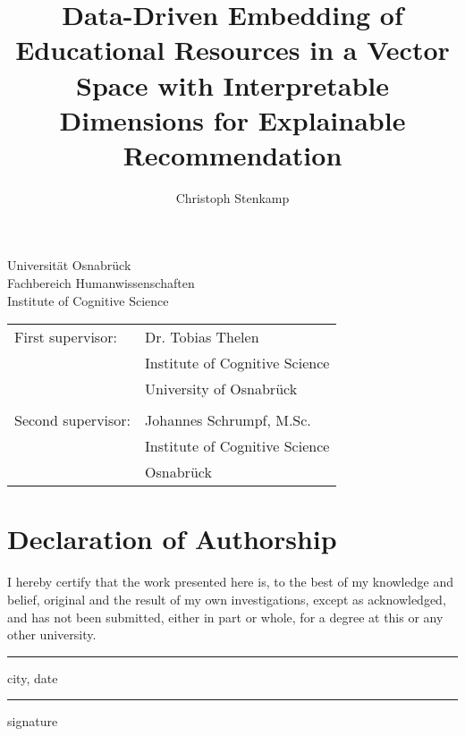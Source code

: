 \documentclass[11pt,
  paper=a4, 
  hidelinks,
  bibliography=totocnumbered,
	captions=tableheading,
	BCOR=10mm
]{scrreprt}
\title{Data-Driven Embedding of Educational Resources in a Vector Space with Interpretable Dimensions for Explainable Recommendation}
\author{Christoph Stenkamp}
\theoremstyle{definition}
\newcommand{\namesigdate}[1][5cm]{%
	\vspace{5cm}
	{\setlength{\parindent}{0cm}
	\begin{minipage}{0.3\textwidth}
		\hrule 
		\vspace{0.5cm}
		{\small city, date}
	\end{minipage}
	 \hfill
	\begin{minipage}{0.3\textwidth}
		\hrule
		\vspace{0.5cm}
	    {\small signature}
	\end{minipage}
	}
}
\begin{document}
\cleardoublepage
\pagestyle{plain} %


\begin{titlepage}
	\begin{flushleft}
		Universität Osnabrück\\
		Fachbereich Humanwissenschaften\\
		Institute of Cognitive Science
	\end{flushleft}

	\vspace{2cm}
	\vspace{1cm}

	\begin{tabular}{ll}
		First supervisor:  & Dr. Tobias Thelen          \\
		                   & Institute of Cognitive Science \\
		                   & University of Osnabrück  \\\\
		Second supervisor: & Johannes Schrumpf, M.Sc.         \\
		                   & Institute of Cognitive Science \\
		                   & Osnabrück
	\end{tabular}

\end{titlepage}


\chapter*{Declaration of Authorship}
I hereby certify that the work presented here is, to the best of my knowledge and belief, original and the result of my own investigations, except as acknowledged, and has not been submitted, either in part or whole, for a degree at this or any other university.

\namesigdate
{}
\pagebreak
\end{document}
